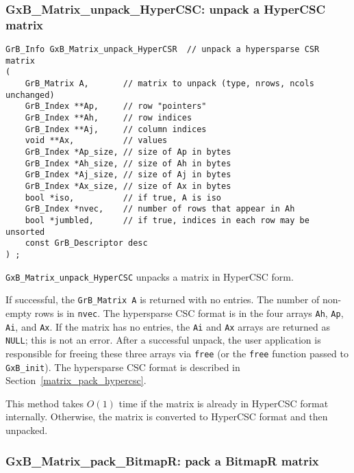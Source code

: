 \documentclass[12pt]{article}
\begin{document}
{\newpage
\subsubsection{{\sf GxB\_Matrix\_unpack\_HyperCSC:} unpack a HyperCSC matrix}
\label{matrix_unpack_hypercsc}

\begin{mdframed}[userdefinedwidth=6in]
{\footnotesize
\begin{verbatim}
GrB_Info GxB_Matrix_unpack_HyperCSR  // unpack a hypersparse CSR matrix
(
    GrB_Matrix A,       // matrix to unpack (type, nrows, ncols unchanged)
    GrB_Index **Ap,     // row "pointers"
    GrB_Index **Ah,     // row indices
    GrB_Index **Aj,     // column indices
    void **Ax,          // values
    GrB_Index *Ap_size, // size of Ap in bytes
    GrB_Index *Ah_size, // size of Ah in bytes
    GrB_Index *Aj_size, // size of Aj in bytes
    GrB_Index *Ax_size, // size of Ax in bytes
    bool *iso,          // if true, A is iso
    GrB_Index *nvec,    // number of rows that appear in Ah
    bool *jumbled,      // if true, indices in each row may be unsorted
    const GrB_Descriptor desc
) ;
\end{verbatim}
} \end{mdframed}

\verb'GxB_Matrix_unpack_HyperCSC' unpacks a matrix in HyperCSC form.

If successful, the \verb'GrB_Matrix A' is
returned with no entries.
The number of non-empty
rows is in \verb'nvec'.  The hypersparse CSC format is in the four arrays
\verb'Ah', \verb'Ap', \verb'Ai', and \verb'Ax'.  If the matrix has no entries,
the \verb'Ai' and \verb'Ax' arrays are returned as \verb'NULL'; this is not an
error.  After a successful unpack, the user application is responsible for
freeing these three arrays via \verb'free' (or the \verb'free' function passed
to \verb'GxB_init').  The hypersparse CSC format is described in
Section~\ref{matrix_pack_hypercsc}.

This method takes $O(1)$ time if the matrix is already in HyperCSC format
internally.  Otherwise, the matrix is converted to HyperCSC format and then
unpacked.


\newpage
\subsubsection{{\sf GxB\_Matrix\_pack\_BitmapR:} pack a BitmapR matrix}
\label{matrix_pack_bitmapr}

}
\end{document}
